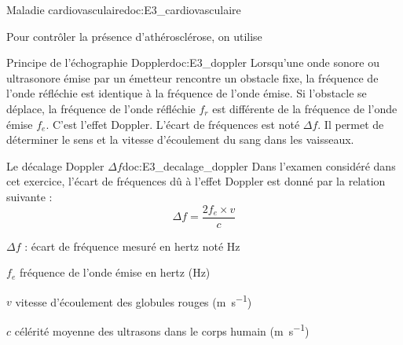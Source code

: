 \label{exo:maladie_cardiovasculaire}

\motsClesCardiovasculaireEchographie
\medskip

\begin{doc}{Maladie cardiovasculaire}{doc:E3_cardiovasculaire}

   Pour contrôler la présence d'athérosclérose, on utilise 
\end{doc}

\begin{doc}{Principe de l'échographie Doppler}{doc:E3_doppler}
  Lorsqu'une onde sonore ou ultrasonore émise par un émetteur rencontre un obstacle fixe, la fréquence de l'onde réfléchie est identique à la fréquence de l'onde émise.
  Si l'obstacle se déplace, la fréquence de l'onde réfléchie $f_r$ est différente de la fréquence de l'onde émise $f_e$.
  C'est l'effet Doppler.
  L'écart de fréquences est noté $\Delta f$.
  Il permet de déterminer le sens et la vitesse d'écoulement du sang dans les vaisseaux.
\end{doc}

\begin{doc}{Le décalage Doppler $\Delta f$}{doc:E3_decalage_doppler}
  Dans l'examen considéré dans cet exercice, l'écart de fréquences dû à l'effet Doppler est donné par la relation suivante :
  \begin{equation*}
    \Delta f = \dfrac{2f_e \times v}{c}
  \end{equation*}
  \begin{listePoints}
    \item $\Delta f$ : écart de fréquence mesuré en hertz noté \unit{\hertz}
    \item $f_e$ fréquence de l'onde émise en hertz (\unit{\hertz})
    \item $v$ vitesse d'écoulement des globules rouges (\unit{\m\per\s})
    \item $c$ célérité moyenne des ultrasons dans le corps humain (\unit{\m\per\s})
  \end{listePoints}
\end{doc}

